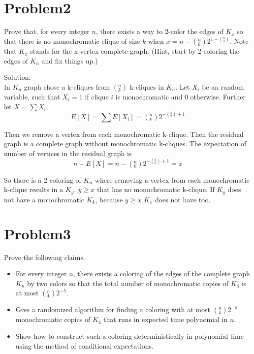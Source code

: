 \documentclass[12pt]{article}
\begin{document}
\section{Problem2}
Prove that, for every integer $n$, there exists a way to 2-color the edges of $K_x$ so that there is no monochromatic clique of size $k$ when $x = n - ({}_k^n) 2^{1-({}_2^k)}$. Note that $K_x$ stands for the x-vertex complete graph. (Hint, start by 2-coloring the edges of $K_n$ and fix things up.)

Solution:\\
In $K_n$ graph chose a k-cliques from $({}_k^n)$ k-cliques in $K_n$. Let $X_i$ be an random variable, such that $X_i=1$ if clique $i$ is monochromatic and 0 otherwise. Further let $X=\sum X_i$.\\
\begin{equation}
E[X] = \sum E[X_i] = ({}_k^n) 2^{-({}_2^k)+1}
\end{equation}

Then we remove a vertex from each monochromatic k-clique. Then the residual graph is a complete graph without monochromatic k-cliques. The expectation of number of vertices in the residual graph is
\begin{equation}
    n-E[X] = n - ({}_k^n) 2^{-({}_2^k)+1} = x
\end{equation}

So there is a 2-coloring of $K_n$ where removing a vertex from each monochromatic k-clique results in a $K_y$, $y\ge x$ that has no monochromatic k-clique. If $K_y$ does not have a monochromatic $K_k$, because $y \ge x$ $K_x$ does not have too.

\section{Problem3}
Prove the following claims.
\begin{itemize}
\item For every integer $n$, there exists a coloring of the edges of the complete graph $K_n$ by two colors so that the total number of monochromatic copies of $K_4$ is at most $({}_4^n) 2^{-5}$.
\item Give a randomized algorithm for finding a coloring with at most $({}_4^n) 2^{-5}$ monochromatic copies of $K_4$ that runs in expected time polynomial in $n$.
\item Show how to construct such a coloring deterministically in polynomial time using the method of conditional expectations.
\end{itemize}
\end{document}
